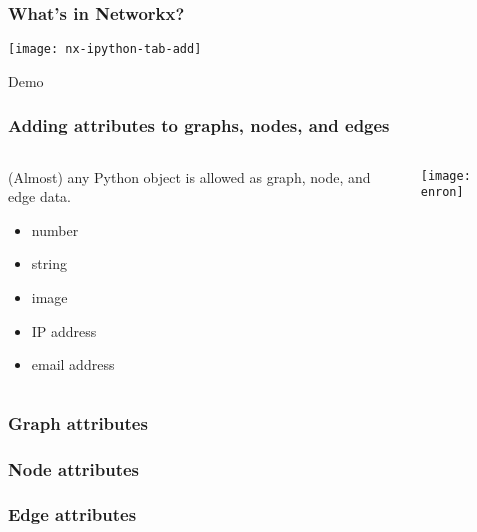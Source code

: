 \begin{frame}
\frametitle{What's in Networkx?}
\centerline{\texttt{[image: nx-ipython-tab-add]}}
Demo
\end{frame}

\begin{frame}[fragile]
\frametitle{Adding attributes to graphs, nodes, and edges}

\begin{columns}
\begin{column}{0.3\textwidth}

(Almost) any Python object is allowed as graph, node, and edge data.
\begin{itemize}
\item number
\item string
\item image
\item IP address
\item email address
\end{itemize}
\end{column}

\begin{column}{0.7\textwidth}
\centerline{\texttt{[image: enron]}}
\end{column}

\end{columns}

\end{frame}


\begin{frame}[fragile]
\frametitle{Graph attributes}


\end{frame}



\begin{frame}[fragile]
\frametitle{Node attributes}


\end{frame}

\begin{frame}[fragile]
\frametitle{Edge attributes}


\end{frame}

